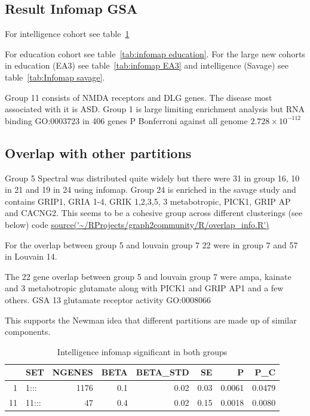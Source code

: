 \subsection{Result Infomap GSA}
\label{sec:result infomap gsa}
For intelligence cohort see table~\ref{tab:Infomap Intelligence infomap significant in both groups}

For education cohort see table~\ref{tab:infomap education}. For the large new cohorts in education (EA3) see table~\ref{tab:infomap EA3} and intelligence (Savage) see table~\ref{tab:Infomap savage}.

Group 11 consists of NMDA receptors and DLG genes. The disease most associated with it is ASD. Group 1 is large limiting enrichment analysis but RNA binding GO:0003723 in 406 genes P Bonferroni against all genome $2.728 \times 10^{-112}$ \subsection{Overlap with other partitions}

Group 5 Spectral was distributed quite widely but there were 31 in group 16, 10 in 21 and 19 in 24 using infomap. Group 24 is enriched in the savage study and contains GRIP1, GRIA 1-4, GRIK 1,2,3,5, 3 metabotropic, PICK1, GRIP AP and CACNG2. This seems to be a cohesive group across different clusterings (see below) code \url{source('~/RProjects/graph2community/R/overlap_info.R')}


For the overlap between group 5 
and louvain group 7 22 were in group 7 and 57 in Louvain 14.

The 22 gene overlap between group 5 and louvain group 7 were ampa, kainate and 3 metabotropic glutamate along with PICK1 and GRIP AP1 and a few others. GSA 13 glutamate receptor activity GO:0008066 

This supports the Newman idea that different partitions are made up of similar components. 





\begin{table}[ht]
\centering
\begin{tabular}{rlrrrrrr}
  \hline
 & SET & NGENES & BETA & BETA\_STD & SE & P & P\_C \\ 
  \hline
1 & 1::: & 1176 & 0.1 & 0.02 & 0.03 & 0.0061 & 0.0479 \\ 
  11 & 11::: & 47 & 0.4 & 0.02 & 0.15 & 0.0018 & 0.0080 \\ 
   \hline
\end{tabular}
\caption{Intelligence infomap significant in both groups}
\label{tab:Infomap Intelligence infomap significant in both groups}
\end{table}

